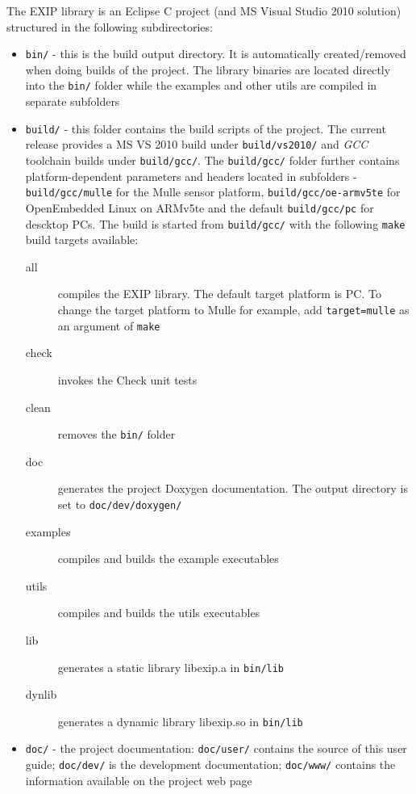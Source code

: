 The EXIP library is an Eclipse C project (and MS Visual Studio 2010 solution)
structured in the following subdirectories:
\begin{itemize}
 \item \texttt{bin/} - this is the build output directory. It is automatically created/removed when
doing builds of the project. The library binaries are located directly into the \texttt{bin/} folder
while the examples and other utils are compiled in separate subfolders

 \item \texttt{build/} - this folder contains the build scripts of the project. The current release
provides a MS VS 2010 build under \texttt{build/vs2010/} and \emph{GCC} toolchain builds under \texttt{build/gcc/}.
The \texttt{build/gcc/} folder further contains platform-dependent parameters and
headers located in subfolders - \texttt{build/gcc/mulle} for the Mulle sensor platform,
\texttt{build/gcc/oe-armv5te} for OpenEmbedded Linux on ARMv5te and the default
\texttt{build/gcc/pc} for descktop PCs. The build is started from \texttt{build/gcc/} with the following
\texttt{make} build targets available:
\begin{description}
 \item[all] compiles the EXIP library. The default target platform is PC. To change the target
platform to Mulle for example, add \texttt{target=mulle} as an argument of \texttt{make}
 \item[check] invokes the Check unit tests
 \item[clean] removes the \texttt{bin/} folder
 \item[doc] generates the project Doxygen documentation. The output directory is set to \texttt{doc/dev/doxygen/}
 \item[examples] compiles and builds the example executables
 \item[utils] compiles and builds the utils executables
 \item[lib] generates a static library libexip.a in \texttt{bin/lib}
 \item[dynlib] generates a dynamic library libexip.so in \texttt{bin/lib}
 \end{description}

 \item \texttt{doc/} - the project documentation: \texttt{doc/user/} contains the source of this user guide;
    \texttt{doc/dev/} is the development documentation; 
  \texttt{doc/www/} contains the information available on the project web page


\end{itemize}

